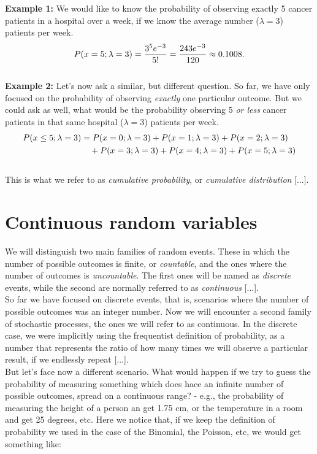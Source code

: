 \documentclass{book}
\begin{document}
\textbf{Example 1:} We would like to know the probability of observing exactly 5 cancer patients in a hospital over a week, if we know the average number ($\lambda = 3$) patients per week.
\begin{equation}
    P(x=5; \lambda = 3) = \frac{3^5 e^{-3}}{5!} = \frac{243 e^{-3}}{120} \approx 0.1008. \notag
\end{equation}\\

\textbf{Example 2:} Let's now ask a similar, but different question. So far, we have only focused on the probability of observing \textit{exactly} one particular outcome. But we could ask as well, what would be the probability observing 5 \textit{or less} cancer patients in that same hospital ($\lambda = 3$) patients per week.
\begin{align}
    P(x \leq 5; \lambda = 3) &= P(x=0; \lambda = 3) + P(x=1; \lambda = 3) + P(x=2; \lambda = 3) \notag \\
    &\quad + P(x=3; \lambda = 3) + P(x=4; \lambda = 3) + P(x=5; \lambda = 3) \notag
\end{align}\\

This is what we refer to as \textit{cumulative probability}, or \textit{cumulative distribution} [...].
\newpage

\section{Continuous random variables}

We will distinguish two main families of random events. These in which the number of possible outcomes is finite, or \textit{countable}, and the ones where the number of outcomes is \textit{uncountable}. The first ones will be named as \textit{discrete} events, while the second are normally referred to as \textit{continuous} [...]. \\

So far we have focused on discrete events, that is, scenarios where the number of possible outcomes was an integer number. Now we will encounter a second family of stochastic processes, the ones we will refer to as continuous. In the discrete case, we were implicitly using the frequentist definition of probability, as a number that represents the ratio of how many times we will observe a particular result, if we endlessly repeat [...].\\

But let's face now a different scenario. What would happen if we try to guess the probability of measuring something which does hace an infinite number of possible outcomes, spread on a continuous range? - e.g., the probability of measuring the height of a person an get 1.75 cm, or the temperature in a room and get 25 degrees, etc. Here we notice that, if we keep the definition of probability we used in the case of the Binomial, the Poisson, etc, we would get something like:
\end{document}
